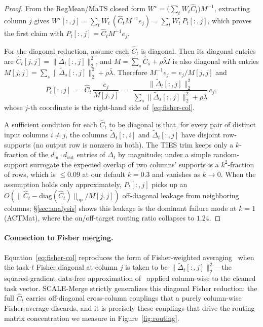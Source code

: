 \documentclass{article} %
\newcommand{\ws}{W^\star}
\begin{document}
\begin{proof}
From the RegMean/MaTS closed form $\ws = \bigl(\sum_t W_t \hat C_t\bigr) M^{-1}$, extracting column $j$ gives
$\ws[:, j] = \sum_t W_t\,(\hat C_t M^{-1} e_j) = \sum_t W_t\, P_t[:, j]$,
which proves the first claim with $P_t[:, j] = \hat C_t M^{-1} e_j$.

For the diagonal reduction, assume each $\hat C_t$ is diagonal. Then its diagonal entries are $\hat C_t[j, j] = \|\tilde\Delta_t[:, j]\|_2^2$, and $M = \sum_s \hat C_s + \rho\bar\lambda I$ is also diagonal with entries $M[j, j] = \sum_s \|\tilde\Delta_s[:, j]\|_2^2 + \rho\bar\lambda$. Therefore $M^{-1}e_j = e_j / M[j, j]$ and
\[
P_t[:, j]
\;=\; \hat C_t\,\frac{e_j}{M[j, j]}
\;=\; \frac{\|\tilde\Delta_t[:, j]\|_2^2}{\sum_s \|\tilde\Delta_s[:, j]\|_2^2 + \rho\bar\lambda}\, e_j,
\]
whose $j$-th coordinate is the right-hand side of~\eqref{eq:fisher-col}.

A sufficient condition for each $\hat C_t$ to be diagonal is that, for every pair of distinct input columns $i\neq j$, the columns $\tilde\Delta_t[:, i]$ and $\tilde\Delta_t[:, j]$ have disjoint row-supports (no output row is nonzero in both). The TIES trim keeps only a $k$-fraction of the $d_\text{in}\cdot d_\text{out}$ entries of $\Delta_t$ by magnitude; under a simple random-support surrogate the expected overlap of two columns' supports is a $k^2$-fraction of rows, which is $\leq 0.09$ at our default $k=0.3$ and vanishes as $k\to 0$. When the assumption holds only approximately, $P_t[:, j]$ picks up an $O(\|\hat C_t - \mathrm{diag}(\hat C_t)\|_{\mathrm{op}} / M[j, j])$ off-diagonal leakage from neighboring columns; \S\ref{sec:analysis} shows this leakage is the dominant failure mode at $k=1$ (ACTMat), where the on/off-target routing ratio collapses to $1.24$.
\end{proof}

\paragraph{Connection to Fisher merging.} Equation~\eqref{eq:fisher-col} reproduces the form of Fisher-weighted averaging~\citep{matena2022merging} when the task-$t$ Fisher diagonal at column $j$ is taken to be $\|\tilde\Delta_t[:, j]\|_2^2$---the squared-gradient data-free approximation of~\citet{pascanu2014revisiting} applied column-wise to the cleaned task vector. SCALE-Merge strictly generalizes this diagonal Fisher reduction: the full $\hat C_t$ carries off-diagonal cross-column couplings that a purely column-wise Fisher average discards, and it is precisely these couplings that drive the routing-matrix concentration we measure in Figure~\ref{fig:routing}.
\end{document}
